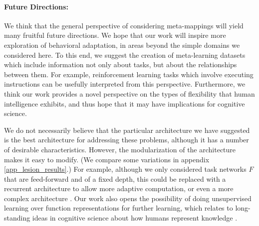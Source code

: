 \documentclass{article}
\begin{document}
\paragraph{Future Directions:} We think that the general perspective of considering meta-mappings will yield many fruitful future directions. We hope that our work will inspire more exploration of behavioral adaptation, in areas beyond the simple domains we considered here. To this end, we suggest the creation of meta-learning datasets which include information not only about tasks, but about the relationships between them. For example, reinforcement learning tasks which involve executing instructions \citep[e.g.][]{Hermann2017, Co-Reyes2019} can be usefully interpreted from this perspective. Furthermore, we think our work provides a novel perspective on the types of flexibility that human intelligence exhibits, and thus hope that it may have implications for cognitive science. \par 
We do not necessarily believe that the particular architecture we have suggested is the best architecture for addressing these problems, although it has a number of desirable characteristics. However, the modularization of the architecture makes it easy to modify. (We compare some variations in appendix \ref{app_lesion_results}.) For example, although we only considered task networks $F$ that are feed-forward and of a fixed depth, this could be replaced with a recurrent architecture to allow more adaptive computation, or even a more complex architecture \citep[e.g.][]{Reed2015, Graves2016}. Our work also opens the possibility of doing unsupervised learning over function representations for further learning, which relates to long-standing ideas in cognitive science about how humans represent knowledge \citep{Clark1993}. \par 
\vspace{-0.5em}
\end{document}
